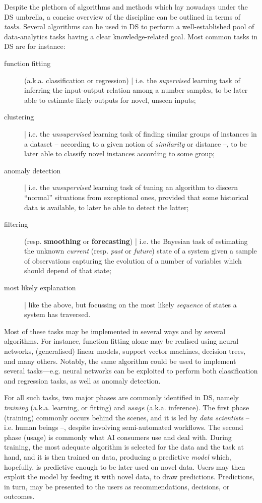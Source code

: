 \documentclass[12pt,a4paper,openright,twoside]{book}
\begin{document}
Despite the plethora of algorithms and methods which lay nowadays under the DS umbrella, a concise overview of the discipline can be outlined in terms of \emph{tasks}.
%
Several algorithms can be used in DS to perform a well-established pool of data-analytics tasks having a clear knowledge-related goal.
%
Most common tasks in DS are for instance:
%
\begin{description}
    \item[function fitting] (a.k.a. classification or regression) | i.e. the \emph{supervised} learning task of inferring the input-output relation among a number samples, to be later able to estimate likely outputs for novel, unseen inputs;
    \item[clustering] | i.e. the \emph{unsupervised} learning task of finding similar groups of instances in a dataset -- according to a given notion of \emph{similarity} or distance --, to be later able to classify novel instances according to some group;
    \item[anomaly detection] | i.e. the \emph{unsupervised} learning task of tuning an algorithm to discern ``normal'' situations from exceptional ones, provided that some historical data is available, to later be able to detect the latter;
    \item[filtering] (resp. \textbf{smoothing} or \textbf{forecasting}) | i.e. the Bayesian task of estimating the unknown \emph{current} (resp. \emph{past} or \emph{future}) state of a system given a sample of observations capturing the evolution of a number of variables which should depend of that state;
    \item[most likely explanation] | like the above, but focussing on the most likely \emph{sequence} of states a system has traversed.
\end{description}
%
Most of these tasks may be implemented in several ways and by several algorithms.
%
For instance, function fitting alone may be realised using neural networks, (generalised) linear models, support vector machines, decision trees, and many others.
%
Notably, the same algorithm could be used to implement several tasks---e.g. neural networks can be exploited to perform both classification and regression tasks, as well as anomaly detection.

For all such tasks, two major phases are commonly identified in DS, namely \emph{training} (a.k.a. learning, or fitting) and \emph{usage} (a.k.a. inference).
%
The first phase (training) commonly occurs behind the scenes, and it is led by \emph{data scientists} -- i.e. human beings --, despite involving semi-automated workflows.
%
The second phase (usage) is commonly what AI consumers use and deal with.
%
During training, the most adequate algorithm is selected for the data and the task at hand, and it is then trained on data, producing a predictive \emph{model} which, hopefully, is predictive enough to be later used on novel data.
%
Users may then exploit the model by feeding it with novel data, to draw predictions.
%
Predictions, in turn, may be presented to the users as recommendations, decisions, or outcomes.
\end{document}
